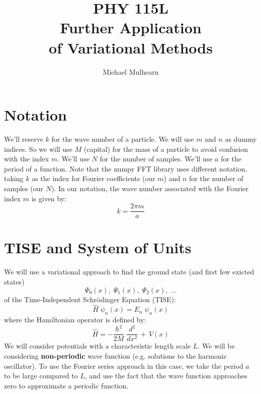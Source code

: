 \documentclass[12pt]{article}
\begin{document}
\newcommand{\ihbar}{\ensuremath{i \hbar}}
\newcommand{\Pss}{\ensuremath{\Psi^*}}
\newcommand{\dPsidt}{\ensuremath{ \frac{\partial \Psi}{\partial t} }}
\newcommand{\dPsidx}{\ensuremath{ \frac{\partial \Psi}{\partial x} }}
\newcommand{\ddPsidx}{\ensuremath{ \frac{\partial^2 \Psi}{\partial x^2} }}
\newcommand{\dPssdt}{\ensuremath{ \frac{\partial \Psi^*}{\partial t} }}
\newcommand{\dPssdx}{\ensuremath{ \frac{\partial \Psi^*}{\partial x} }}
\newcommand{\ddPssdx}{\ensuremath{ \frac{\partial^2 \Psi^*}{\partial x^2} }}

\newcommand{\dphidt}{\ensuremath{ \frac{d \phi}{dt} }}
\newcommand{\dpsidx}{\ensuremath{ \frac{d \psi}{dx} }}
\newcommand{\ddpsidx}{\ensuremath{ \frac{d^2 \psi}{dx^2} }}


\title{PHY 115L \\ Further Application \\ of Variational Methods }
\author{Michael Mulhearn}

\maketitle

\section{Notation}

We'll reserve $k$ for the wave number of a particle.  We will use $m$
and $n$ as dummy indices.  So we will use $M$ (capital) for the mass
of a particle to avoid confusion with the index $m$.  We'll use $N$
for the number of samples.  We'll use $a$ for the period of a
function.  Note that the numpy FFT library uses different notation,
taking $k$ as the index for Fourier coefficients (our $m$) and $n$ for
the number of samples (our $N$).  In our notation, the wave number
associated with the Fourier index $m$ is given by:
\begin{equation}
k = \frac{2 \pi m}{a}
\end{equation}

\section{TISE and System of Units}

\noindent
We will use a variational approach to find the ground state (and first
few exicted states)
$$\Psi_0(x), \; \Psi_1(x), \; \Psi_2(x), \; \ldots$$
of the Time-Independent
Schr\"odinger Equation (TISE):
$$\hat{H} \; \psi_n(x) = E_n \; \psi_n(x)$$
where the Hamiltonian operator is defined by:
\begin{equation}
\hat{H} = -\frac{\hbar^2}{2 M} \; \frac{d^2}{dx^2} \, + \, V(x)
\end{equation}
We will consider potentials with a characteristic length scale $L$.
We will be considering {\bf non-periodic} wave function
(e.g. solutions to the harmonic oscillator).  To use the Fourier
series approach in this case, we take the period $a$ to be large
compared to $L$, and use the fact that the wave function approaches
zero to approximate a periodic function.
\end{document}
